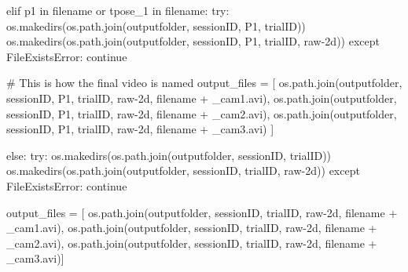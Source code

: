 \documentclass[
  letterpaper,
  DIV=11,
  numbers=noendperiod]{scrreprt}
\newenvironment{Shaded}{\begin{snugshade}}{\end{snugshade}}
\newcommand{\CommentTok}[1]{\textcolor[rgb]{0.37,0.37,0.37}{#1}}
\newcommand{\ControlFlowTok}[1]{\textcolor[rgb]{0.00,0.23,0.31}{#1}}
\newcommand{\KeywordTok}[1]{\textcolor[rgb]{0.00,0.23,0.31}{#1}}
\newcommand{\NormalTok}[1]{\textcolor[rgb]{0.00,0.23,0.31}{#1}}
\newcommand{\OperatorTok}[1]{\textcolor[rgb]{0.37,0.37,0.37}{#1}}
\newcommand{\PreprocessorTok}[1]{\textcolor[rgb]{0.68,0.00,0.00}{#1}}
\newcommand{\StringTok}[1]{\textcolor[rgb]{0.13,0.47,0.30}{#1}}
\begin{document}
\begin{Shaded}
\begin{Highlighting}[]
    \ControlFlowTok{elif} \StringTok{\textquotesingle{}p1\textquotesingle{}} \KeywordTok{in}\NormalTok{ filename }\KeywordTok{or} \StringTok{\textquotesingle{}tpose\_1\textquotesingle{}} \KeywordTok{in}\NormalTok{ filename:}
        \ControlFlowTok{try}\NormalTok{:}
\NormalTok{            os.makedirs(os.path.join(outputfolder, sessionID, }\StringTok{\textquotesingle{}P1\textquotesingle{}}\NormalTok{, trialID))}
\NormalTok{            os.makedirs(os.path.join(outputfolder, sessionID, }\StringTok{\textquotesingle{}P1\textquotesingle{}}\NormalTok{, trialID, }\StringTok{\textquotesingle{}raw{-}2d\textquotesingle{}}\NormalTok{))}
        \ControlFlowTok{except} \PreprocessorTok{FileExistsError}\NormalTok{:}
            \ControlFlowTok{continue}    

        \CommentTok{\# This is how the final video is named}
\NormalTok{        output\_files }\OperatorTok{=}\NormalTok{ [}
\NormalTok{            os.path.join(outputfolder, sessionID, }\StringTok{\textquotesingle{}P1\textquotesingle{}}\NormalTok{, trialID, }\StringTok{\textquotesingle{}raw{-}2d\textquotesingle{}}\NormalTok{, filename }\OperatorTok{+} \StringTok{\textquotesingle{}\_cam1.avi\textquotesingle{}}\NormalTok{),}
\NormalTok{            os.path.join(outputfolder, sessionID, }\StringTok{\textquotesingle{}P1\textquotesingle{}}\NormalTok{, trialID, }\StringTok{\textquotesingle{}raw{-}2d\textquotesingle{}}\NormalTok{, filename }\OperatorTok{+} \StringTok{\textquotesingle{}\_cam2.avi\textquotesingle{}}\NormalTok{),}
\NormalTok{            os.path.join(outputfolder, sessionID, }\StringTok{\textquotesingle{}P1\textquotesingle{}}\NormalTok{, trialID, }\StringTok{\textquotesingle{}raw{-}2d\textquotesingle{}}\NormalTok{, filename }\OperatorTok{+} \StringTok{\textquotesingle{}\_cam3.avi\textquotesingle{}}\NormalTok{)}
\NormalTok{        ]}

    \ControlFlowTok{else}\NormalTok{:}
        \ControlFlowTok{try}\NormalTok{:}
\NormalTok{            os.makedirs(os.path.join(outputfolder, sessionID, trialID))}
\NormalTok{            os.makedirs(os.path.join(outputfolder, sessionID, trialID, }\StringTok{\textquotesingle{}raw{-}2d\textquotesingle{}}\NormalTok{))}
        \ControlFlowTok{except} \PreprocessorTok{FileExistsError}\NormalTok{:}
            \ControlFlowTok{continue}

\NormalTok{        output\_files }\OperatorTok{=}\NormalTok{ [}
\NormalTok{            os.path.join(outputfolder, sessionID, trialID, }\StringTok{\textquotesingle{}raw{-}2d\textquotesingle{}}\NormalTok{, filename }\OperatorTok{+} \StringTok{\textquotesingle{}\_cam1.avi\textquotesingle{}}\NormalTok{),}
\NormalTok{            os.path.join(outputfolder, sessionID, trialID, }\StringTok{\textquotesingle{}raw{-}2d\textquotesingle{}}\NormalTok{, filename }\OperatorTok{+} \StringTok{\textquotesingle{}\_cam2.avi\textquotesingle{}}\NormalTok{),}
\NormalTok{            os.path.join(outputfolder, sessionID, trialID, }\StringTok{\textquotesingle{}raw{-}2d\textquotesingle{}}\NormalTok{, filename }\OperatorTok{+} \StringTok{\textquotesingle{}\_cam3.avi\textquotesingle{}}\NormalTok{)]}


\end{Highlighting}
\end{Shaded}
\end{document}
